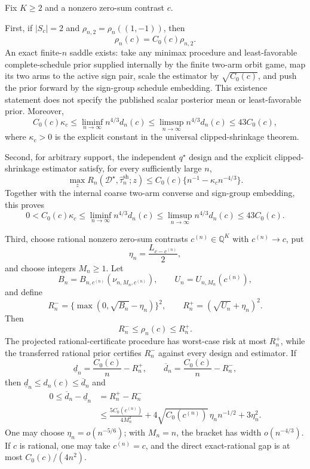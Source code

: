 Fix \(K\geq2\) and a nonzero zero-sum contrast \(c\).

First, if \(|S_c|=2\) and \(\rho_{n,2}=\rho_n((1,-1))\), then
\[
 \rho_n(c)=C_0(c)\rho_{n,2}.
\]
An exact finite-\(n\) saddle exists: take any minimax procedure and least-favorable complete-schedule prior supplied internally by the finite two-arm orbit game, map its two arms to the active sign pair, scale the estimator by \(\sqrt{C_0(c)}\), and push the prior forward by the sign-group schedule embedding. This existence statement does not specify the published scalar posterior mean or least-favorable prior. Moreover,
\[
 C_0(c)\kappa_c
 \leq\liminf_{n\to\infty}n^{4/3}d_n(c)
 \leq\limsup_{n\to\infty}n^{4/3}d_n(c)
 \leq43C_0(c),
\]
where \(\kappa_c>0\) is the explicit constant in the universal clipped-shrinkage theorem.

Second, for arbitrary support, the independent \(q^\star\) design and the explicit clipped-shrinkage estimator satisfy, for every sufficiently large \(n\),
\[
 \max_zR_n(\mathcal D^\star,\widehat\tau_n^{\mathrm{sh}};z)
 \leq C_0(c)\{n^{-1}-\kappa_cn^{-4/3}\}.
\]
Together with the internal coarse two-arm converse and sign-group embedding, this proves
\[
 0<C_0(c)\kappa_c
 \leq\liminf_{n\to\infty}n^{4/3}d_n(c)
 \leq\limsup_{n\to\infty}n^{4/3}d_n(c)
 \leq43C_0(c).
\]

Third, choose rational nonzero zero-sum contrasts \(c^{(n)}\in\mathbb Q^K\) with \(c^{(n)}\to c\), put
\[
 \eta_n=\frac{L_{c-c^{(n)}}}{2},
\]
and choose integers \(M_n\geq1\). Let
\[
 B_n=B_{n,c^{(n)}}(\nu_{n,M_n,c^{(n)}}),
 \qquad U_n=U_{n,M_n}(c^{(n)}),
\]
and define
\[
 R_n^-=\{\max(0,\sqrt{B_n}-\eta_n)\}^2,
 \qquad R_n^+=(\sqrt{U_n}+\eta_n)^2.
\]
Then
\[
 R_n^-\leq\rho_n(c)\leq R_n^+.
\]
The projected rational-certificate procedure has worst-case risk at most \(R_n^+\), while the transferred rational prior certifies \(R_n^-\) against every design and estimator. If
\[
 \underline d_n=\frac{C_0(c)}n-R_n^+,
 \qquad \overline d_n=\frac{C_0(c)}n-R_n^-,
\]
then \(\underline d_n\leq d_n(c)\leq\overline d_n\) and
\[
 \begin{aligned}
 0\leq\overline d_n-\underline d_n
 &=R_n^+-R_n^-\\
 &\leq\frac{5C_0(c^{(n)})}{4M_n^2}
 +4\sqrt{C_0(c^{(n)})}\,\eta_nn^{-1/2}
 +3\eta_n^2.
 \end{aligned}
\]
One may choose \(\eta_n=o(n^{-5/6})\); with \(M_n=n\), the bracket has width \(o(n^{-4/3})\). If \(c\) is rational, one may take \(c^{(n)}=c\), and the direct exact-rational gap is at most \(C_0(c)/(4n^2)\).

